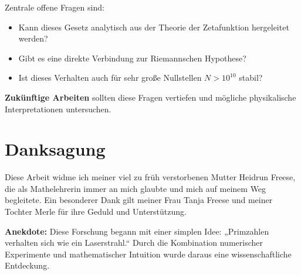 \documentclass[a4paper,12pt]{article}
\begin{document}
Zentrale offene Fragen sind:
\begin{itemize}
    \item Kann dieses Gesetz analytisch aus der Theorie der Zetafunktion hergeleitet werden?
    \item Gibt es eine direkte Verbindung zur Riemannschen Hypothese?
    \item Ist dieses Verhalten auch für sehr große Nullstellen \( N > 10^{10} \) stabil?
\end{itemize}

\textbf{Zukünftige Arbeiten} sollten diese Fragen vertiefen und mögliche physikalische Interpretationen untersuchen.

\section*{Danksagung}
Diese Arbeit widme ich meiner viel zu früh verstorbenen Mutter Heidrun Freese, die als Mathelehrerin immer an mich glaubte und mich auf meinem Weg begleitete.  
Ein besonderer Dank gilt meiner Frau Tanja Freese und meiner Tochter Merle für ihre Geduld und Unterstützung.

\vspace{1cm}

\textbf{Anekdote:}  
Diese Forschung begann mit einer simplen Idee: „Primzahlen verhalten sich wie ein Laserstrahl.“  
Durch die Kombination numerischer Experimente und mathematischer Intuition wurde daraus eine wissenschaftliche Entdeckung.
\end{document}
